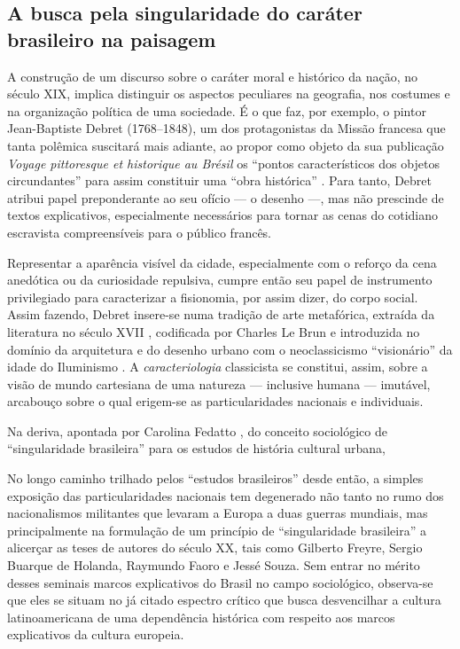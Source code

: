 \hypertarget{a-busca-pela-singularidade-do-caruxe1ter-brasileiro-na-paisagem}{%
\subsection{A busca pela singularidade do caráter brasileiro na
paisagem}\label{a-busca-pela-singularidade-do-caruxe1ter-brasileiro-na-paisagem}}

A construção de um discurso sobre o caráter moral e histórico da nação,
no século XIX, implica distinguir os aspectos peculiares na geografia,
nos costumes e na organização política de uma sociedade. É o que faz,
por exemplo, o pintor Jean-Baptiste Debret (1768--1848), um dos
protagonistas da Missão francesa que tanta polêmica suscitará mais
adiante, ao propor como objeto da sua publicação \emph{Voyage
pittoresque et historique au Brésil} os ``pontos característicos dos
objetos circundantes'' para assim constituir uma ``obra histórica''
\autocite[p.~i--ii]{debret:1834voyage1}. Para tanto, Debret atribui
papel preponderante ao seu ofício --- o desenho ---, mas não prescinde
de textos explicativos, especialmente necessários para tornar as cenas
do cotidiano escravista compreensíveis para o público francês.

Representar a aparência visível da cidade, especialmente com o reforço
da cena anedótica ou da curiosidade repulsiva, cumpre então seu papel de
instrumento privilegiado para caracterizar a fisionomia, por assim
dizer, do corpo social. Assim fazendo, Debret insere-se numa tradição de
arte metafórica, extraída da literatura no século XVII
\autocite{delft:1993nature}, codificada por Charles Le Brun
\autocite{dabbs:2002characterising65} e introduzida no domínio da
arquitetura e do desenho urbano com o neoclassicismo ``visionário'' da
idade do Iluminismo \autocite{pigafetta:2009passioni}. A
\emph{caracteriologia} classicista se constitui, assim, sobre a visão de
mundo cartesiana de uma natureza --- inclusive humana --- imutável,
arcabouço sobre o qual erigem-se as particularidades nacionais e
individuais.

Na deriva, apontada por Carolina Fedatto
\autocite*[102]{fedatto:2013saber}, do conceito sociológico de
``singularidade brasileira'' para os estudos de história cultural
urbana,

No longo caminho trilhado pelos ``estudos brasileiros'' desde então, a
simples exposição das particularidades nacionais tem degenerado não
tanto no rumo dos nacionalismos militantes que levaram a Europa a duas
guerras mundiais, mas principalmente na formulação de um princípio de
``singularidade brasileira'' a alicerçar as teses de autores do século
XX, tais como Gilberto Freyre, Sergio Buarque de Holanda, Raymundo Faoro
e Jessé Souza. Sem entrar no mérito desses seminais marcos explicativos
do Brasil no campo sociológico, observa-se que eles se situam no já
citado espectro crítico que busca desvencilhar a cultura latinoamericana
de uma dependência histórica com respeito aos marcos explicativos da
cultura europeia.


